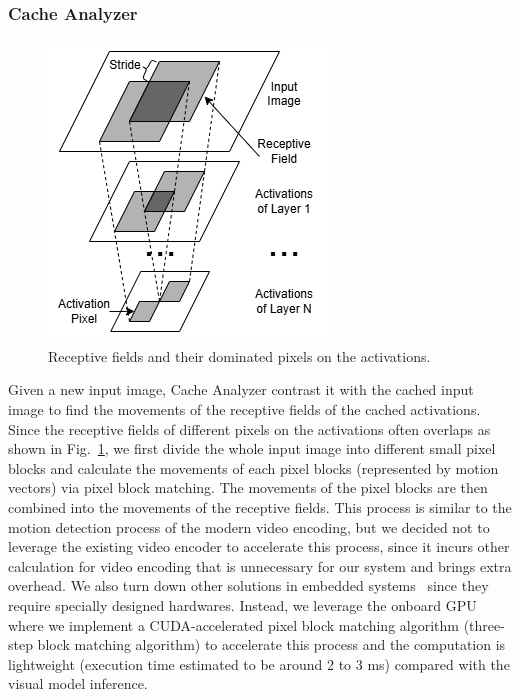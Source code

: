 \subsubsection{Cache Analyzer}
\begin{figure}
    \includegraphics[width=0.5\linewidth]{fig/insight.drawio.png}
    \caption[short]{Receptive fields and their dominated pixels on the activations.}
    \label{fig:receptive field}
\end{figure}
Given a new input image, Cache Analyzer contrast it with the cached input image to find the movements of the receptive fields of the cached activations.
Since the receptive fields of different pixels on the activations often overlaps as shown in Fig.~\ref{fig:receptive field}, we first divide the whole input image into different small pixel blocks and calculate the movements of each pixel blocks (represented by motion vectors) via pixel block matching.
The movements of the pixel blocks are then combined into the movements of the receptive fields.
This process is similar to the motion detection process of the modern video encoding, but we decided not to leverage the existing video encoder to accelerate this process, since it incurs other calculation for video encoding that is unnecessary for our system and brings extra overhead.
We also turn down other solutions in embedded systems~\cite{buckler_eva_2018} since they require specially designed hardwares.
Instead, we leverage the onboard GPU where we implement a CUDA-accelerated pixel block matching algorithm (three-step block matching algorithm) to accelerate this process and the computation is lightweight (execution time estimated to be around 2 to 3 ms) compared with the visual model inference.

